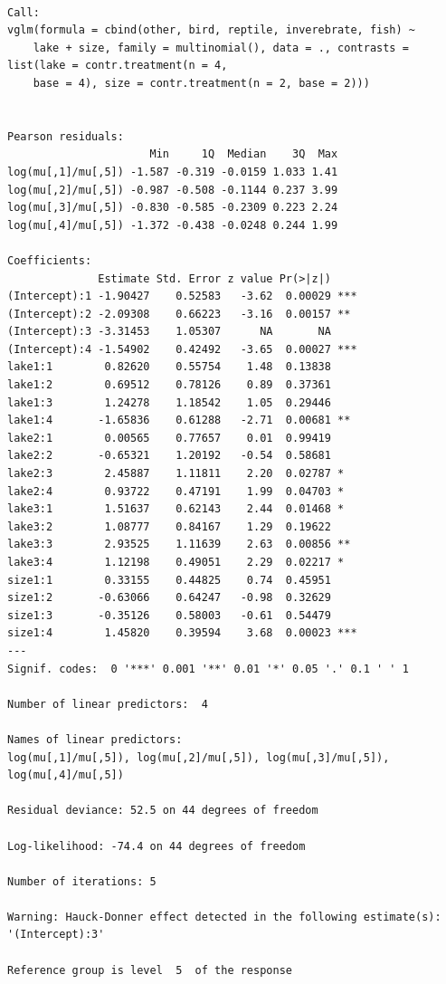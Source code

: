 \documentclass[]{book}
\begin{document}
\begin{verbatim}

Call:
vglm(formula = cbind(other, bird, reptile, inverebrate, fish) ~ 
    lake + size, family = multinomial(), data = ., contrasts = list(lake = contr.treatment(n = 4, 
    base = 4), size = contr.treatment(n = 2, base = 2)))


Pearson residuals:
                      Min     1Q  Median    3Q  Max
log(mu[,1]/mu[,5]) -1.587 -0.319 -0.0159 1.033 1.41
log(mu[,2]/mu[,5]) -0.987 -0.508 -0.1144 0.237 3.99
log(mu[,3]/mu[,5]) -0.830 -0.585 -0.2309 0.223 2.24
log(mu[,4]/mu[,5]) -1.372 -0.438 -0.0248 0.244 1.99

Coefficients: 
              Estimate Std. Error z value Pr(>|z|)    
(Intercept):1 -1.90427    0.52583   -3.62  0.00029 ***
(Intercept):2 -2.09308    0.66223   -3.16  0.00157 ** 
(Intercept):3 -3.31453    1.05307      NA       NA    
(Intercept):4 -1.54902    0.42492   -3.65  0.00027 ***
lake1:1        0.82620    0.55754    1.48  0.13838    
lake1:2        0.69512    0.78126    0.89  0.37361    
lake1:3        1.24278    1.18542    1.05  0.29446    
lake1:4       -1.65836    0.61288   -2.71  0.00681 ** 
lake2:1        0.00565    0.77657    0.01  0.99419    
lake2:2       -0.65321    1.20192   -0.54  0.58681    
lake2:3        2.45887    1.11811    2.20  0.02787 *  
lake2:4        0.93722    0.47191    1.99  0.04703 *  
lake3:1        1.51637    0.62143    2.44  0.01468 *  
lake3:2        1.08777    0.84167    1.29  0.19622    
lake3:3        2.93525    1.11639    2.63  0.00856 ** 
lake3:4        1.12198    0.49051    2.29  0.02217 *  
size1:1        0.33155    0.44825    0.74  0.45951    
size1:2       -0.63066    0.64247   -0.98  0.32629    
size1:3       -0.35126    0.58003   -0.61  0.54479    
size1:4        1.45820    0.39594    3.68  0.00023 ***
---
Signif. codes:  0 '***' 0.001 '**' 0.01 '*' 0.05 '.' 0.1 ' ' 1

Number of linear predictors:  4 

Names of linear predictors: 
log(mu[,1]/mu[,5]), log(mu[,2]/mu[,5]), log(mu[,3]/mu[,5]), log(mu[,4]/mu[,5])

Residual deviance: 52.5 on 44 degrees of freedom

Log-likelihood: -74.4 on 44 degrees of freedom

Number of iterations: 5 

Warning: Hauck-Donner effect detected in the following estimate(s):
'(Intercept):3'

Reference group is level  5  of the response
\end{verbatim}
\end{document}
